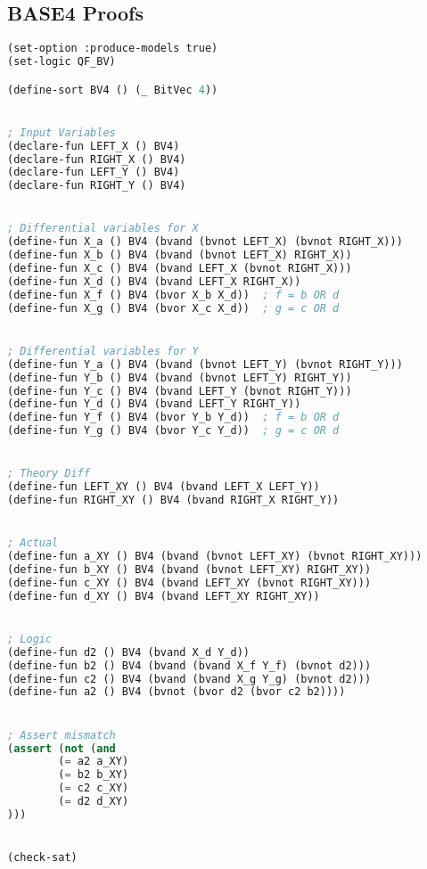 \subsection{BASE4 Proofs}
\begin{lstlisting}[language=lisp, caption={AND logic proof}, label=lst:and-proof]
(set-option :produce-models true)
(set-logic QF_BV)

(define-sort BV4 () (_ BitVec 4))


; Input Variables
(declare-fun LEFT_X () BV4)
(declare-fun RIGHT_X () BV4)
(declare-fun LEFT_Y () BV4)
(declare-fun RIGHT_Y () BV4)


; Differential variables for X
(define-fun X_a () BV4 (bvand (bvnot LEFT_X) (bvnot RIGHT_X)))
(define-fun X_b () BV4 (bvand (bvnot LEFT_X) RIGHT_X))
(define-fun X_c () BV4 (bvand LEFT_X (bvnot RIGHT_X)))
(define-fun X_d () BV4 (bvand LEFT_X RIGHT_X))
(define-fun X_f () BV4 (bvor X_b X_d))  ; f = b OR d
(define-fun X_g () BV4 (bvor X_c X_d))  ; g = c OR d


; Differential variables for Y
(define-fun Y_a () BV4 (bvand (bvnot LEFT_Y) (bvnot RIGHT_Y)))
(define-fun Y_b () BV4 (bvand (bvnot LEFT_Y) RIGHT_Y))
(define-fun Y_c () BV4 (bvand LEFT_Y (bvnot RIGHT_Y)))
(define-fun Y_d () BV4 (bvand LEFT_Y RIGHT_Y))
(define-fun Y_f () BV4 (bvor Y_b Y_d))  ; f = b OR d
(define-fun Y_g () BV4 (bvor Y_c Y_d))  ; g = c OR d


; Theory Diff
(define-fun LEFT_XY () BV4 (bvand LEFT_X LEFT_Y))
(define-fun RIGHT_XY () BV4 (bvand RIGHT_X RIGHT_Y))


; Actual
(define-fun a_XY () BV4 (bvand (bvnot LEFT_XY) (bvnot RIGHT_XY)))
(define-fun b_XY () BV4 (bvand (bvnot LEFT_XY) RIGHT_XY))
(define-fun c_XY () BV4 (bvand LEFT_XY (bvnot RIGHT_XY)))
(define-fun d_XY () BV4 (bvand LEFT_XY RIGHT_XY))


; Logic
(define-fun d2 () BV4 (bvand X_d Y_d))
(define-fun b2 () BV4 (bvand (bvand X_f Y_f) (bvnot d2)))
(define-fun c2 () BV4 (bvand (bvand X_g Y_g) (bvnot d2)))
(define-fun a2 () BV4 (bvnot (bvor d2 (bvor c2 b2))))


; Assert mismatch
(assert (not (and
		(= a2 a_XY)
		(= b2 b_XY)
		(= c2 c_XY)
		(= d2 d_XY)
)))


(check-sat)
\end{lstlisting}


